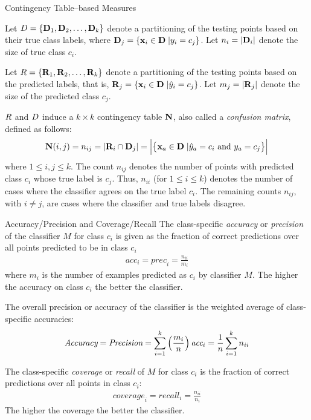 \begin{frame}{Contingency Table--based Measures}

Let ${\relax D} = \{\mathbf{D}_1, \mathbf{D}_2, \ldots, \mathbf{D}_k\}$ denote a partitioning of the
testing points based on their true class labels, where $\mathbf{D}_{j} =
\{\mathbf{x}_i  \in \mathbf{D} \;| y_i = c_{j}\}$.  Let $n_i = |\mathbf{D}_i|$ denote the
size of true class $c_i$.

\medskip Let ${\relax R} = \{\mathbf{R}_1, \mathbf{R}_2, \ldots, \mathbf{R}_k\}$ denote a
partitioning of the testing points based on the predicted labels, that
is, $\mathbf{R}_{j} = \{\mathbf{x}_i \in \mathbf{D} \;| \hat{y}_i = c_{j}\}$.  Let $m_{j} =
|\mathbf{R}_{j}|$ denote the size of the predicted class $c_{j}$.

\medskip
${\relax R}$ and ${\relax D}$ induce a $k \times k$ contingency table $\mathbf{N}$,
also called a {\em confusion matrix},
 
def\/{i}ned as follows:
\begin{align*}
  \mathbf{N}(i,j) = n_{ij}  = \left| \mathbf{R}_i \cap \mathbf{D}_{j} \right| =
\Bigl| \bigl\{ \mathbf{x}_a \in \mathbf{D} \;| \hat{y}_a = c_i \text{ and } y_a = c_{j}
  \bigr\} \Bigr|
\end{align*}
where $1\le i, j \le k$.
The count $n_{ij}$ denotes the number of points with
predicted class $c_i$ whose true label is $c_{j}$. Thus,
$n_{ii}$ (for $1 \le i \le k$) denotes the number of cases where the
classif\/{i}er agrees on the true label $c_i$. The remaining counts
$n_{ij}$, with $i \ne j$, are cases where the classif\/{i}er and true
labels disagree.
\end{frame}



\begin{frame}{Accuracy/Precision and Coverage/Recall}
The class-specif\/{i}c {\em accuracy} or {\em precision} of the
classif\/{i}er $M$ for class $c_i$ is given as the fraction of correct
predictions over all points predicted to be in class $c_i$
\begin{align*}
  \textit{acc}_i = \textit{prec}_i = \frac{n_{ii}}{m_{i}}
\end{align*}
where $m_i$ is the number of examples predicted as $c_i$ by classif\/{i}er $M$.
The higher the accuracy on class $c_i$ the better the classif\/{i}er.

\medskip
The overall precision or accuracy of the classif\/{i}er is the
weighted average of class-specif\/{i}c accuracies:
\begin{align*}
  \textit{Accuracy} = \textit{Precision} = \sum_{i=1}^k \left(\frac{m_i}{n}\right) \textit{acc}_i =
  \frac{1}{n} \sum_{i=1}^k n_{ii}
\end{align*}

\medskip
The
class-specif\/{i}c {\em coverage} or {\em recall}  of $M$ for class
$c_i$ is the fraction of correct predictions over all points in
class $c_i$:
\begin{align*}
  \textit{coverage}_i = \textit{recall}_i = \frac{n_{ii}}{n_{i}}
 \end{align*}
The higher the coverage the better the classif\/{i}er.
\end{frame}


